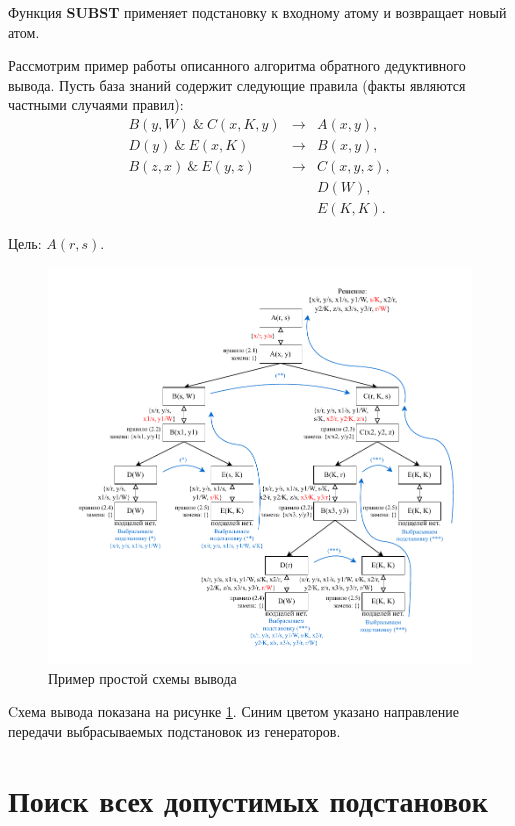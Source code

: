 Функция \textbf{SUBST} применяет подстановку к входному атому и возвращает новый атом.

Рассмотрим пример работы описанного алгоритма обратного дедуктивного вывода. Пусть база знаний содержит следующие правила (факты являются частными случаями правил):
\begin{eqnarray}
  B(y, W) ~\&~ C(x, K, y) &\rightarrow& A(x, y), \\
  D(y) ~\&~ E(x, K) &\rightarrow& B(x, y), \\
  B(z, x) ~\&~ E(y, z) &\rightarrow& C(x, y, z), \\
  && D(W), \\
  && E(K, K).                     
\end{eqnarray}

Цель: $A(r, s)$.

\begin{figure}[ht!]
  \centering
  \includegraphics[width=\linewidth]{backward-ask-1.pdf}
  \caption{Пример простой схемы вывода}
  \label{fig:ask1}
\end{figure}

Cхема вывода показана на рисунке \ref{fig:ask1}. Синим цветом указано направление передачи выбрасываемых подстановок из генераторов.

\section{Поиск всех допустимых подстановок}

